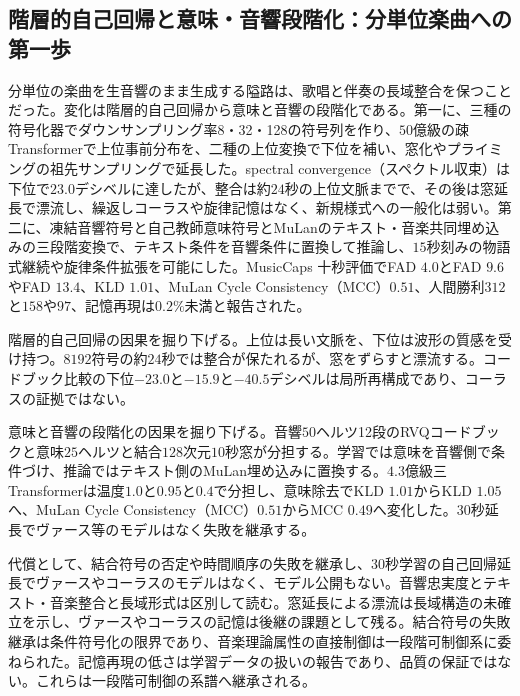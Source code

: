 \documentclass[lualatex,a4paper,10pt]{jlreq}
\begin{document}
\subsection{階層的自己回帰と意味・音響段階化：分単位楽曲への第一歩}
分単位の楽曲を生音響のまま生成する隘路は、歌唱と伴奏の長域整合を保つことだった\autocite{btd063}。変化は階層的自己回帰から意味と音響の段階化である\autocite{btd063,btd065}。第一に、三種の符号化器でダウンサンプリング率8・32・128の符号列を作り、$50$億級の疎Transformerで上位事前分布を、二種の上位変換で下位を補い、窓化やプライミングの祖先サンプリングで延長した\autocite{btd063}。spectral convergence（スペクトル収束）は下位で$23.0$デシベルに達したが、整合は約$24$秒の上位文脈までで、その後は窓延長で漂流し、繰返しコーラスや旋律記憶はなく、新規様式への一般化は弱い\autocite{btd063}。第二に、凍結音響符号と自己教師意味符号とMuLanのテキスト・音楽共同埋め込みの三段階変換で、テキスト条件を音響条件に置換して推論し、$15$秒刻みの物語式継続や旋律条件拡張を可能にした\autocite{btd065}。MusicCaps 十秒評価でFAD $4.0$とFAD $9.6$やFAD $13.4$、KLD $1.01$、MuLan Cycle Consistency（MCC）$0.51$、人間勝利$312$と$158$や$97$、記憶再現は$0.2\%$未満と報告された\autocite{btd065}。

階層的自己回帰の因果を掘り下げる。上位は長い文脈を、下位は波形の質感を受け持つ\autocite{btd063}。$8192$符号の約$24$秒では整合が保たれるが、窓をずらすと漂流する\autocite{btd063}。コードブック比較の下位$-23.0$と$-15.9$と$-40.5$デシベルは局所再構成であり、コーラスの証拠ではない\autocite{btd063}。

意味と音響の段階化の因果を掘り下げる。音響$50$ヘルツ12段のRVQコードブックと意味$25$ヘルツと結合$128$次元$10$秒窓が分担する\autocite{btd065}。学習では意味を音響側で条件づけ、推論ではテキスト側のMuLan埋め込みに置換する\autocite{btd065}。$4.3$億級三Transformerは温度$1.0$と$0.95$と$0.4$で分担し、意味除去でKLD $1.01$からKLD $1.05$へ、MuLan Cycle Consistency（MCC）$0.51$からMCC $0.49$へ変化した\autocite{btd065}。$30$秒延長でヴァース等のモデルはなく失敗を継承する\autocite{btd065}。

代償として、結合符号の否定や時間順序の失敗を継承し、$30$秒学習の自己回帰延長でヴァースやコーラスのモデルはなく、モデル公開もない\autocite{btd065}。音響忠実度とテキスト・音楽整合と長域形式は区別して読む\autocite{btd063,btd065}。窓延長による漂流は長域構造の未確立を示し、ヴァースやコーラスの記憶は後継の課題として残る\autocite{btd063}。結合符号の失敗継承は条件符号化の限界であり、音楽理論属性の直接制御は一段階可制御系に委ねられた\autocite{btd065,btd066}。記憶再現の低さは学習データの扱いの報告であり、品質の保証ではない\autocite{btd065}。これらは一段階可制御の系譜へ継承される\autocite{btd063,btd065,btd066}。
\end{document}
